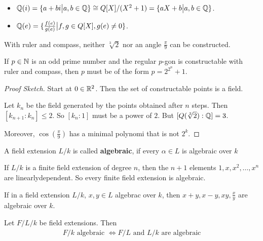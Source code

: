 \begin{itemize}
  \item $\mathbb{Q}(i) =\{ a + b i \big\vert a,b \in \mathbb{Q}\} \cong Q[X]/(X^{2}+1) = \{aX + b \big\vert a,b \in \mathbb{Q}\}$.
  \item $\mathbb{Q}(e) = \{\frac{f(e)}{g(e)} \big\vert f,g \in Q[X], g(e) \neq 0\}$.
\end{itemize}



\begin{cor}[Wantzel]
  With ruler and compass, neither $\sqrt[3]{2}$ nor an angle $\frac{\pi}{9}$ can be constructed.

  If $p \in \mathbb{N}$ is an odd prime number and the regular $p$-gon is constructable with ruler and compass, then $p$ must be of the form $p = 2^{2^{n}} + 1$.
\end{cor}
\begin{proof}[Proof Sketch]
  Start at $0 \in \mathbb{R}^{2}$.
  Then the set of constructable points is a field.

  Let $k_n$ be the field generated by the points obtained after $n$ steps.
  Then $[k_{n+1}:k_n] \leq 2$.
  So $[k_n:1]$ must be a power of $2$.
  But $[Q(\sqrt[3]{2}):\mathbb{Q}] = 3$.

  Moreover, $\cos(\frac{\pi}{9})$ has a minimal polynomi that is not $2^{k}$.
\end{proof}

\begin{dfn}[]
  A field extension $L/k$ is called \textbf{algebraic}, if every $\alpha \in L$ is algebraic over $k$
\end{dfn}

If $L/k$ is a finite field extension of degree $n$, then the $n+1$ elements $1,x,x^{2}, \ldots,x^{n}$ are linearlydependent. So every finite field extension is algebraic.


\begin{cor}[]
  If in a field extension $L/k$, $x,y \in L$ algebrac over $k$, then $x+y,x-y,xy, \frac{x}{y}$ are algebraic over $k$.
\end{cor}

\begin{cor}[]
  Let $F/L/k$ be field extensions. Then
  \begin{align*}
    F/k \text{ algebraic } \iff F/L \text{ and } L/k \text{ are algebraic}
  \end{align*}
\end{cor}



